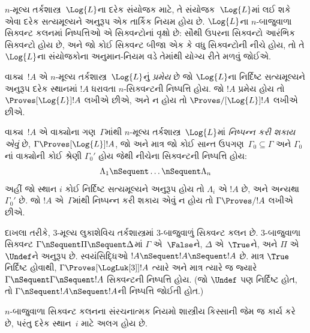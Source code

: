 $n$-મૂલ્ય તર્કશાસ્ત્ર~$\Log{L}$ના દરેક સંયોજક માટે,
તે સંયોજક~$\Log{L}$માં લઈ શકે એવા દરેક સત્યમૂલ્યને
અનુરૂપ એક તાર્કિક નિયમ હોય છે. $\Log{L}$ના $n$-બાજુવાળા
સિક્વન્ટ કલનમાં નિષ્પત્તિઓ એ સિક્વન્ટોનાં વૃક્ષો છે:
સૌથી ઉપરના સિક્વન્ટો આરંભિક સિક્વન્ટો હોય છે, અને
જો કોઈ સિક્વન્ટ બીજા એક કે વધુ સિક્વન્ટોની નીચે હોય,
તો તે $\Log{L}$ના સંયોજકોના અનુમાન-નિયમ વડે તેમાંથી
યોગ્ય રીતે મળવું જોઈએ.

\begin{defn}[પ્રમેયો]
વાક્ય~$!A$ એ $n$-મૂલ્ય તર્કશાસ્ત્ર~$\Log{L}$નું
\emph{પ્રમેય} છે જો $\Log{L}$ના નિર્દિષ્ટ સત્યમૂલ્યને
અનુરૂપ દરેક સ્થાનમાં $!A$ ધરાવતા $n$-સિક્વન્ટની
નિષ્પત્તિ હોય. જો $!A$ પ્રમેય હોય તો
$\Proves[\Log{L}] !A$ લખીએ છીએ, અને ન હોય તો
$\Proves/[\Log{L}] !A$ લખીએ છીએ.
\end{defn}

\begin{defn}[નિષ્પન્નક્ષમતા]
વાક્ય~$!A$ એ વાક્યોના ગણ~$\Gamma$માંથી
$n$-મૂલ્ય તર્કશાસ્ત્ર~$\Log{L}$માં \emph{નિષ્પન્ન કરી શકાય એવું}
છે, $\Gamma \Proves[\Log{L}] !A$, જો અને માત્ર જો
કોઈ સાન્ત ઉપગણ~$\Gamma_0 \subseteq \Gamma$
અને $\Gamma_0$નાં વાક્યોની કોઈ શ્રેણી $\Gamma_0'$
હોય જેથી નીચેના સિક્વન્ટની નિષ્પત્તિ હોય:
\[ \Lambda_1 \nSequent \dots \nSequent \Lambda_n \]
અહીં જો સ્થાન $i$ કોઈ નિર્દિષ્ટ સત્યમૂલ્યને અનુરૂપ હોય
તો $\Lambda_i$ એ $!A$ છે, અને અન્યથા $\Gamma_0'$ છે.
જો $!A$ એ~$\Gamma$માંથી નિષ્પન્ન કરી શકાય એવું ન હોય તો
$\Gamma \Proves/ !A$ લખીએ છીએ.
\end{defn}

દાખલા તરીકે, $3$-મૂલ્ય લુકાશેવિચ તર્કશાસ્ત્રમાં
$3$-બાજુવાળું સિક્વન્ટ કલન છે. $3$-બાજુવાળા સિક્વન્ટ
$\Gamma \nSequent \Pi \nSequent \Delta$માં $\Gamma$
એ~$\False$ને, $\Delta$ એ~$\True$ને, અને $\Pi$
એ~$\Undef$ને અનુરૂપ છે. સ્વયંસિદ્ધિઓ
$!A \nSequent !A \nSequent !A$ છે. માત્ર $\True$
નિર્દિષ્ટ હોવાથી, $\Gamma \Proves[\LogLuk[3]] !A$
ત્યારે અને માત્ર ત્યારે જ જ્યારે
$\Gamma \nSequent \Gamma \nSequent !A$ સિક્વન્ટની
નિષ્પત્તિ હોય. (જો $\Undef$ પણ નિર્દિષ્ટ હોત,
તો $\Gamma \nSequent !A \nSequent !A$ની
નિષ્પત્તિ જોઈતી હોત.)
\endgroup


\begingroup
\makeatletter{}\makeatother


\label{guunit:OLP-0405}


$n$-બાજુવાળા સિક્વન્ટ કલનના સંરચનાત્મક નિયમો
શાસ્ત્રીય કિસ્સાની જેમ જ કાર્ય કરે છે, પરંતુ દરેક
સ્થાન~$i$ માટે અલગ હોય છે.

